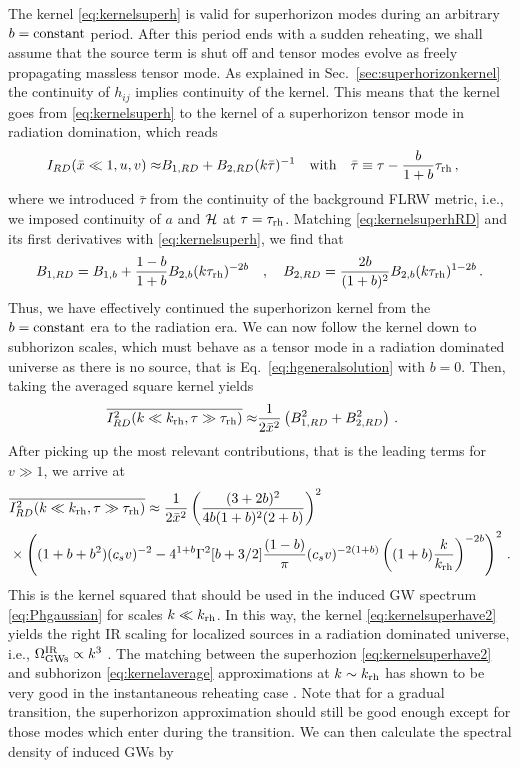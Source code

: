 \documentclass[a4paper,11pt]{article}
\numberwithin{equation}{section}
\begin{document}
The kernel \eqref{eq:kernelsuperh} is valid for superhorizon modes during an arbitrary $b={\rm constant}$ period. After this period ends with a sudden reheating, we shall assume that the source term is shut off and tensor modes evolve as freely propagating massless tensor mode. As explained in Sec.~\ref{sec:superhorizonkernel} the continuity of $h_{ij}$ implies continuity of the kernel. This means that the kernel goes from \eqref{eq:kernelsuperh} to the kernel of a superhorizon tensor mode in radiation domination, which reads 
\begin{align}\label{eq:kernelsuperhRD}
I_{RD}(\bar x\ll1,u,v)\approx & B_{1,RD}+B_{2,RD} (k\bar\tau)^{-1}\quad {\rm with}\quad \bar\tau\equiv\tau-\frac{b}{1+b}\tau_{\rm rh}\,,
\end{align}
where we introduced $\bar\tau$ from the continuity of the background FLRW metric, i.e., we imposed continuity of $a$ and $\cal H$ at $\tau=\tau_{\rm rh}$.
Matching \eqref{eq:kernelsuperhRD} and its first derivatives with \eqref{eq:kernelsuperh}, we find that
\begin{align}
B_{1,RD}=B_{1,b}+\frac{1-b}{1+b}B_{2,b}(k\tau_{\rm rh})^{-2b}\quad,\quad B_{2,RD}=\frac{2b}{(1+b)^2}B_{2,b} (k\tau_{\rm rh})^{1-2b}\,.
\end{align}
Thus, we have effectively continued the superhorizon kernel from the $b={\rm constant}$ era to the radiation era. We can now follow the kernel down to subhorizon scales, which must behave as a tensor mode in a radiation dominated universe as there is no source, that is Eq.~\eqref{eq:hgeneralsolution} with $b=0$. Then, taking the averaged square kernel yields
\begin{align}\label{eq:kernelsuperhave1}
\overline{I^2_{RD}(k\ll k_{\rm rh},\tau\gg \tau_{\rm rh})}\approx & \frac{1}{2\bar x^2}\left(B_{1,RD}^2+B_{2,RD}^2\right)\,.
\end{align}
After picking up the most relevant contributions, that is the leading terms for $v\gg1$, we arrive at
\begin{align}\label{eq:kernelsuperhave2}
&\overline{I^2_{RD}(k\ll k_{\rm rh},\tau\gg \tau_{\rm rh})}\approx \frac{1}{2\bar x^2}\left(\frac{(3+2b)^2}{4b(1+b)^2(2+b)}\right)^2 \nonumber\\&\times\left({(1+b+b^2)}(c_sv)^{-2}-4^{1+b}\Gamma^2[b+3/2]\frac{(1-b)}{\pi}(c_sv)^{-2(1+b)}\left((1+b)\frac{k}{k_{\rm rh}}\right)^{-2b}\right)^2\,.
\end{align}
This is the kernel squared that should be used in the induced GW spectrum \eqref{eq:Phgaussian} for scales $k\ll k_{\rm rh}$. In this way, the kernel \eqref{eq:kernelsuperhave2} yields the right IR scaling for localized sources in a radiation dominated universe, i.e., $\Omega^{\rm IR}_{\rm GWs}\propto k^3$ \cite{Cai:2019cdl}. The matching between the superhozion \eqref{eq:kernelsuperhave2} and subhorizon \eqref{eq:kernelaverage} approximations at $k\sim k_{\rm rh}$ has shown to be very good in the instantaneous reheating case \cite{Domenech:2020kqm}. Note that for a gradual transition, the superhorizon approximation should still be good enough except for those modes which enter during the transition. We can then calculate the spectral density of induced GWs by
\end{document}
